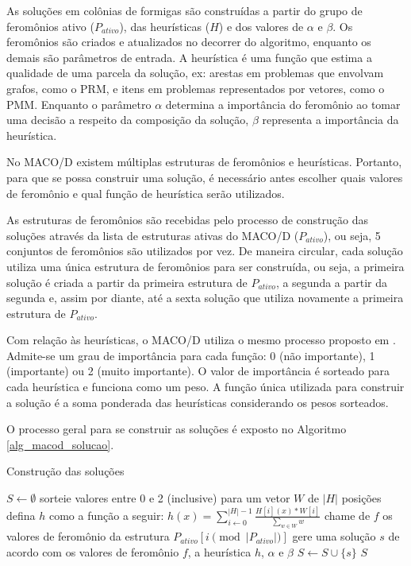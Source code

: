 As soluções em colônias de formigas são construídas a partir do grupo de feromônios ativo ($P_{ativo}$), das heurísticas ($H$) e dos valores de $\alpha$ e $\beta$. Os feromônios são criados e atualizados no decorrer do algoritmo, enquanto os demais são parâmetros de entrada. A heurística é uma função que estima a qualidade de uma parcela da solução, ex: arestas em problemas que envolvam grafos, como o PRM, e itens em problemas representados por vetores, como o PMM. Enquanto o parâmetro $\alpha$ determina a importância do feromônio ao tomar uma decisão a respeito da composição da solução, $\beta$ representa a importância da heurística.

No MACO/D existem múltiplas estruturas de feromônios e heurísticas. Portanto, para que se possa construir uma solução, é necessário antes escolher quais valores de feromônio e qual função de heurística serão utilizados. 

As estruturas de feromônios são recebidas pelo processo de construção das soluções através da lista de estruturas ativas do MACO/D ($P_{ativo}$), ou seja, 5 conjuntos de feromônios são utilizados por vez. De maneira circular, cada solução utiliza uma única estrutura de feromônios para ser construída, ou seja, a primeira solução é criada a partir da primeira estrutura de $P_{ativo}$, a segunda a partir da segunda e, assim por diante, até a sexta solução que utiliza novamente a primeira estrutura de $P_{ativo}$.

Com relação às heurísticas, o MACO/D utiliza o mesmo processo proposto em \cite{Riveros2016}. Admite-se um grau de importância para cada função: 0 (não importante), 1 (importante) ou 2 (muito importante). O valor de importância é sorteado para cada heurística e funciona como um peso. A função única utilizada para construir a solução é a soma ponderada das heurísticas considerando os pesos sorteados.

O processo geral para se construir as soluções é exposto no Algoritmo \ref{alg_macod_solucao}.

\begin{algorithm}
	\caption{Construção das soluções}
	\label{alg_macod_solucao}
	\begin{algorithmic}[1]
		\State $S \gets \emptyset$
			\State sorteie valores entre 0 e 2 (inclusive) para um vetor $W$ de $|H|$ posições
			\State defina $h$ como a função a seguir: $h(x) = \sum_{i \gets 0}^{|H|-1}\frac{H[i](x) * W[i]}{\sum\limits_{w \in W}w}$
			\State chame de $f$ os valores de feromônio da estrutura $P_{ativo}[i \pmod{|P_{ativo}|}]$
			\State gere uma solução $s$ de acordo com os valores de feromônio $f$, a heurística $h$, $\alpha$ e $\beta$
			\State $S \gets S \cup \{s\}$
		\EndFor
		\State \Return $S$
	\end{algorithmic}
\end{algorithm}

